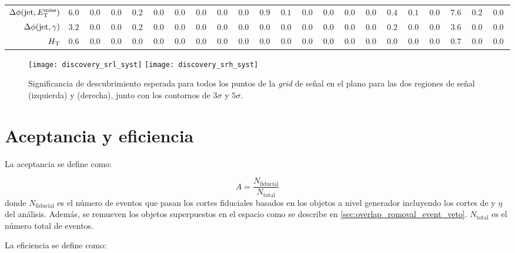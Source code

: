 \begin{table}
{\begin{tabular}{r|rrr|rrr|rrr|rrr|rrr|rrr|rrr}
       $\Delta \phi (\mathrm{jet},E_{\mathrm{T}}^{\mathrm{miss}})$         &   $6.01$ & $0.00$ & $0.00$ & $0.22$ & $0.01$ & $0.00$ &  $0.00$ &  $0.00$ &  $0.00$ &     $0.98$ &     $0.16$ & $0.00$ & $0.00$ & $0.00$ & $0.04$ &  $0.41$ &  $0.11$ & $0.00$ &     $7.62$ &     $0.28$ &  $0.04$ \\
       $\Delta \phi (\mathrm{jet},\gamma)$         &   $3.21$ & $0.00$ & $0.00$ & $0.22$ & $0.00$ & $0.00$ &  $0.00$ &  $0.00$ &  $0.00$ &     $0.00$ &     $0.00$ & $0.00$ & $0.00$ & $0.00$ & $0.00$ &  $0.25$ &  $0.04$ & $0.00$ &     $3.69$ &     $0.04$ &  $0.00$ \\
       $H_{\mathrm{T}}$             &   $0.66$ & $0.00$ & $0.00$ & $0.00$ & $0.00$ & $0.00$ &  $0.00$ &  $0.00$ &  $0.00$ &     $0.00$ &     $0.00$ & $0.00$ & $0.00$ & $0.00$ & $0.00$ &  $0.08$ &  $0.02$ & $0.00$ &     $0.74$ &     $0.02$ &  $0.00$ \\
       \hline
    \end{tabular}
  }
\end{table}



\begin{figure}[!htbp]
  \centering

  \texttt{[image: discovery\_srl\_syst]}
  \texttt{[image: discovery\_srh\_syst]}

  \caption{Significancia de descubrimiento esperada para todos los puntos de la \emph{grid} de señal en el
    plano {\mgmn} para las dos regiones de señal {\SRL} (izquierda) y {\SRH} (derecha), junto
    con los contornos de $3\sigma$ y $5\sigma$.}

  \label{fig:opt_discovery_exp}
\end{figure}


\section{Aceptancia y eficiencia}

La aceptancia se define como:

\begin{equation}
  A = \frac{N_\mathrm{fiducial}}{N_\mathrm{total}}
\end{equation}
%
donde $N_\mathrm{fiducial}$ es el número de eventos que pasan los cortes
fiduciales basados en los objetos a nivel generador incluyendo los
cortes de {\pt} y $\eta$ del análisis. Además, se remueven los objetos
superpuestos en el espacio {\etaphi} como se describe en
\cref{sec:overlap_romoval_event_veto}. $N_\mathrm{total}$ es el número total
de eventos.

La eficiencia se define como:

